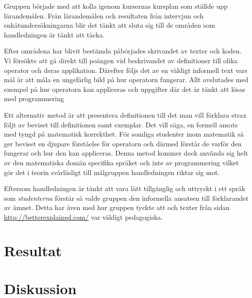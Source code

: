 \documentclass[]{article}
\begin{document}
Gruppen började med att kolla igenom kursernas kursplan som ställde upp lärandemålen. 
Från lärandemålen och resultaten från intervjun och enkätundersökningarna blir det 
tänkt att sluta sig till de områden som handledningen är tänkt att täcka. %

Efter områdena har blivit bestämda påbörjades skrivandet av texter och koden. %
Vi försökte att gå direkt till poängen vid beskrivandet av definitioner till 
olika operator och deras applikation. Därefter följs det av en väldigt informell 
text vars mål är att måla en ungefärlig bild på hur operatorn fungerar. 
Allt avslutades med exempel på hur operatorn kan appliceras och uppgifter där 
det är tänkt att lösas med programmering 

Ett alternativ metod är att presentera definitionen till det man vill förklara strax 
följt av beviset till definitionen samt exemplar. Det vill säga, en formell ansats med tyngd 
på matematisk korrekthet. För somliga studenter inom matematik så ger beviset en djupare förståelse 
för operatorn och därmed förstår de varför den fungerar och hur den kan appliceras. Denna metod 
kommer dock använda sig helt av den matematiska domän specifika språket och inte av programmering 
vilket gör det i teorin svårläsligt till målgruppen handledningen riktar sig mot.

Eftersom handledningen är tänkt att vara lätt tillgänglig och uttryckt i ett språk 
som \emph{studenterna} förstår så valde gruppen den informella ansatsen till förklarandet av ämnet. 
Detta har även med hur gruppen tyckte att \cite{learnyouahaskell} och texter från sidan
\url{http://betterexplained.com/} var väldigt pedagogiska.  

\section{Resultat}


%


\section{Diskussion}
\end{document}
